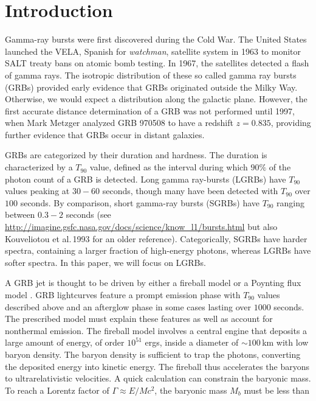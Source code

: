 \documentclass{article}
\begin{document}
\newpage
\thispagestyle{empty}
\mbox{}
\newpage

{\centering\tableofcontents}
\setcounter{page}{1}
\newpage
\thispagestyle{empty}
\mbox{}
\newpage

\section{Introduction}
Gamma-ray bursts were first discovered during the Cold War. The United States launched the VELA, Spanish for \textit{watchman}, satellite system in 1963 to monitor SALT treaty bans on atomic bomb testing. In 1967, the satellites detected a flash of gamma rays. The isotropic distribution of these so called gamma ray bursts (GRBs) provided early evidence that GRBs originated outside the Milky Way. Otherwise, we would expect a distribution along the galactic plane. However, the first accurate distance determination of a GRB was not performed until 1997, when Mark Metzger analyzed GRB 970508 to have a redshift $z=0.835$, providing further evidence that GRBs occur in distant galaxies.

GRBs are categorized by their duration and hardness. The duration is characterized by a $T_{90}$ value, defined as the interval during which $90\%$ of the photon count of a GRB is detected. Long gamma ray-bursts (LGRBs) have $T_{90}$ values peaking at $30-60$ seconds, though many have been detected with $T_{90}$ over $100$ seconds. By comparison, short gamma-ray bursts (SGRBs) have $T_{90}$ ranging between $0.3-2$ seconds (see \url{http://imagine.gsfc.nasa.gov/docs/science/know_l1/bursts.html} but also Kouveliotou et al.\,1993 \cite{Kouv:1993ap} for an older reference). Categorically, SGRBs have harder spectra, containing a larger fraction of high-energy photons, whereas LGRBs have softer spectra. In this paper, we will focus on LGRBs.

A GRB jet is thought to be driven by either a fireball model \cite{Rosswog:2007ap} or a Poynting flux model \cite{Metzger:2010pp}. GRB lightcurves feature a prompt emission phase with $T_{90}$ values described above and an afterglow phase in some cases lasting over $1000$ seconds. The prescribed model must explain these features as well as account for nonthermal emission. The fireball model involves a central engine that deposits a large amount of energy, of order $10^{51}$ ergs, inside a diameter of $\sim 100$\,km with low baryon density. The baryon density is sufficient to trap the photons, converting the deposited energy into kinetic energy. The fireball thus accelerates the baryons to ultrarelativistic velocities. A quick calculation can constrain the baryonic mass. To reach a Lorentz factor of $\Gamma \approx E/M c^2$, the baryonic mass $M_b$ must be less than
\end{document}
